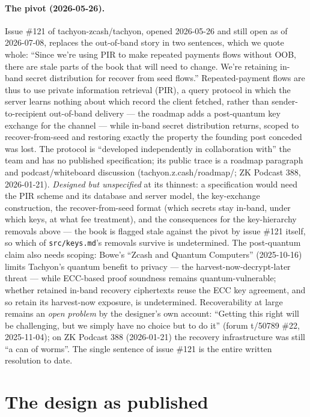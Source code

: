 \documentclass[11pt,a4paper]{article}
\theoremstyle{definition}
\begin{document}
\paragraph{The pivot (2026-05-26).} Issue \#121 of tachyon-zcash/tachyon,
opened 2026-05-26 and still open as of 2026-07-08, replaces the out-of-band
story in two sentences, which we quote whole:
``Since we're using PIR to make repeated payments flows without OOB, there
are stale parts of the book that will need to change. We're retaining
in-band secret distribution for recover from seed flows.'' Repeated-payment
flows are thus to use private information retrieval (PIR), a query
protocol in which the server learns nothing about which record the client
fetched, rather than sender-to-recipient out-of-band delivery --- the
roadmap adds a post-quantum key exchange for the channel --- while
in-band secret distribution returns,
scoped to recover-from-seed and restoring exactly the property the founding
post conceded was lost. The protocol is ``developed independently in
collaboration with'' the team and has no published specification; its
public trace is a roadmap paragraph and podcast/whiteboard discussion
(tachyon.z.cash/roadmap/; ZK Podcast 388, 2026-01-21). \emph{Designed but
unspecified} at its thinnest: a specification would need the PIR scheme and
its database and server model, the key-exchange construction, the
recover-from-seed format (which secrets stay in-band, under which keys, at
what fee treatment), and the consequences for the key-hierarchy removals
above --- the book is flagged stale against the pivot by issue \#121
itself, so which of \texttt{src/keys.md}'s removals survive is
undetermined. The post-quantum claim also needs scoping: Bowe's ``Zcash and
Quantum Computers'' (2025-10-16) limits Tachyon's quantum benefit to privacy
--- the harvest-now-decrypt-later threat --- while ECC-based proof soundness
remains quantum-vulnerable; whether retained in-band recovery ciphertexts
reuse the ECC key agreement, and so retain its harvest-now exposure, is
undetermined. Recoverability at large remains an \emph{open problem} by the
designer's own account: ``Getting this right will be challenging, but we
simply have no choice but to do it'' (forum t/50789 \#22, 2025-11-04); on ZK
Podcast 388
(2026-01-21) the recovery infrastructure was still ``a can of worms''. The
single sentence of issue \#121 is the entire written resolution to date.

\section{The design as published}\label{sec:tachyon-design}
\end{document}
